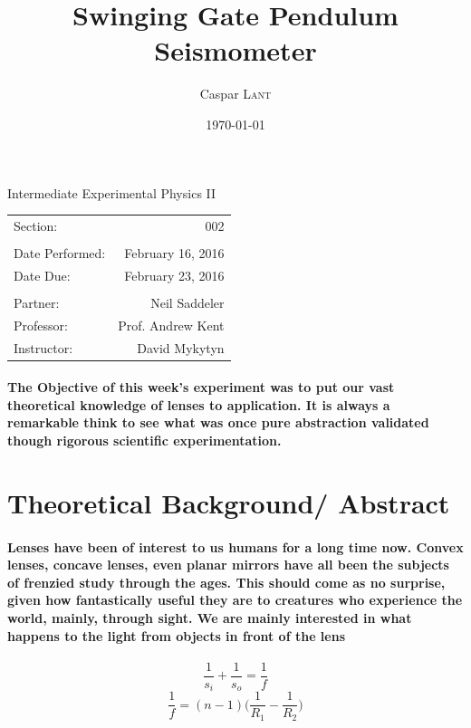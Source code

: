 \documentclass{amsart}
\title{Swinging Gate Pendulum Seismometer}
\author{Caspar \textsc{Lant}} %
\date{\today} %
\begin{document}
\bigskip

\maketitle %
\begin{center}

Intermediate Experimental Physics II\\
\vspace{1.5cm}

\begin{tabular}{l r}

Section: & 002\\
\\
Date Performed: & February 16, 2016 \\ %
Date Due: & February 23, 2016\\
\\
Partner: & Neil Saddeler\\ %
Professor: & Prof. Andrew Kent\\
Instructor: & David Mykytyn %
\end{tabular}
\end{center}
\vspace{50mm}
\pagebreak

\paragraph{\textbf{The Objective} of this week's experiment was to put our vast theoretical knowledge of lenses to application. It is always a remarkable think to see what was once pure abstraction validated though rigorous scientific experimentation. }

\section{Theoretical Background/ Abstract}
\paragraph{Lenses have been of interest to us humans for a long time now. Convex lenses, concave lenses, even planar mirrors have all been the subjects of frenzied study through the ages. This should come as no surprise, given how fantastically useful they are to creatures who experience the world, mainly, through sight. We are mainly interested in what happens to the light from objects in front of the lens}
\begin{equation}
\frac{1}{s_i}+ \frac{1}{s_o} = \frac{1}{f}
\end{equation}
\begin{equation}
\frac{1}{f} = (n-1)\Big(\frac{1}{R_1} - \frac{1}{R_2}\Big)
\end{equation}
\end{document}
